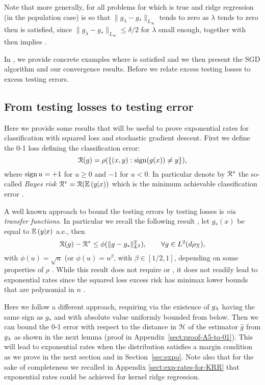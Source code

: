 \documentclass[final]{colt2018} %
\begin{document}
Note that more generally, for all problems for which  is true and ridge regression (in the population case) is so that
$
\| g_\lambda - g_\ast\|_{L_\infty}
$ tends to zero as $\lambda$ tends to zero then  is satisfied, since 
$\| g_\lambda - g_\ast\|_{L_\infty}  \leqslant \delta/2$ for $\lambda$ small enough, together with  then implies .

In  , we provide concrete examples where   is satisfied and we then present the SGD algorithm and our convergence results. Before we relate excess testing losses to excess testing errors.

\subsection{From testing losses to testing error}
Here we provide some results that will be useful to prove exponential rates for classification with squared loss and stochastic gradient descent. First we define the 0-1 loss defining the classification error:
$${\cal R}(g) = \rho(\{(x,y) : \mathop{ \mathrm{sign}}(g(x)) \neq y \}),$$
where $\mathop{ \mathrm{sign}} u = +1$ for $u \geq 0$ and $-1$ for $u < 0$.
In particular denote by ${\cal R}^*$ the so-called {\em Bayes risk} ${\cal R}^* = {\cal R}(\mathbb{E}\left({y}\middle|{x}\right))$ which is the minimum achievable classification error \citep{devroye2013probabilistic}.

A well known approach to bound the testing errors by testing losses is \emph{via transfer functions}. In particular we recall the following result \citep{devroye2013probabilistic,bartlett2006convexity}, let $g_\ast(x)$ be equal to $\mathbb{E}\left({y}\middle|{x}\right)$ a.e., then
$$
{\cal R}(g) - {\cal R}^* \leq \phi(\|g - g_\ast\|^2_{L^2}), \qquad \forall g \in L^2(d{\rho_{{\mathcal X}}}),
$$ 
with $\phi(u) = \sqrt{u}$ (or $\phi(u) = u^\beta$, with $\beta \in [1/2,1]$, depending on some properties of $\rho$ \citep{bartlett2006convexity}. While this result does not require  or , it does not readily lead to exponential rates since the squared loss excess risk has minimax lower bounds that are polynomial in $n$ \citep[see][]{caponnetto2007optimal}.

Here we follow a different approach, requiring via  the existence of $g_\lambda$ having the same sign as $g_\ast$ and with  absolute value uniformly bounded from below. Then we can  bound the 0-1 error with respect to the distance in $\mathcal H$ of the estimator $\widehat{g}$ from $g_\lambda$ as shown in the next lemma (proof in Appendix~\ref{sect:proof-A5-to-01}). This will lead to exponential rates when the distribution satisfies a margin condition   as we prove in the next section and in Section~\ref{sec:expo}. Note also that for the sake of completeness we recalled in Appendix \ref{sect:exp-rates-for-KRR} that exponential rates could be achieved for kernel ridge regression.
\end{document}

